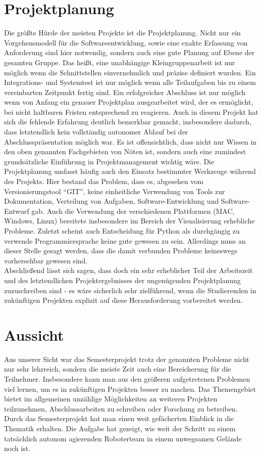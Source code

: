 \section{Projektplanung}
Die größte Hürde der meisten Projekte ist die Projektplanung. Nicht nur ein Vorgehensmodell für die Softwareentwicklung, sowie eine exakte Erfassung von Anforderung sind hier notwendig, sondern auch eine gute Planung auf Ebene der gesamten Gruppe. Das heißt, eine unabhängige Kleingruppenarbeit ist nur möglich wenn die Schnittstellen einvernehmlich und präzise definiert wurden. Ein Integrations- und Systemtest ist nur möglich wenn alle Teilaufgaben bis zu einem vereinbarten Zeitpunkt fertig sind. Ein erfolgreicher Abschluss ist nur möglich wenn von Anfang ein genauer Projektplan ausgearbeitet wird, der es ermöglicht, bei nicht haltbaren Fristen entsprechend zu reagieren.
Auch in diesem Projekt hat sich die fehlende Erfahrung deutlich bemerkbar gemacht, insbesondere dadurch, dass letztendlich kein vollständig autonomer Ablauf bei der Abschlusspräsentation möglich war. Es ist offensichtlich, dass nicht nur Wissen in den oben genannten Fachgebieten von Nöten ist, sondern auch eine zumindest grundsätzliche Einführung in Projektmanagement wichtig wäre.
Die Projektplanung umfasst häufig auch den Einsatz bestimmter Werkzeuge während des Projekts. Hier bestand das Problem, dass es, abgesehen vom Versionierungstool ``GIT'', keine einheitliche Verwendung von Tools zur Dokumentation, Verteilung von Aufgaben, Software-Entwicklung und Software-Entwurf gab. 
Auch die Verwendung der verschiedenen Plattformen (MAC, Windows, Linux) bereitete insbesondere im Bereich der Visualisierung erhebliche Probleme.
Zuletzt scheint auch Entscheidung für Python als durchgängig zu verwende Programmiersprache keine gute gewesen zu sein. Allerdings muss an dieser Stelle gesagt werden, dass die damit verbunden Probleme keineswegs vorhersehbar gewesen sind.
\\
Abschließend lässt sich sagen, dass doch ein sehr erheblicher Teil der Arbeitszeit und des letztendlichen Projektergebnisses der ungenügenden Projektplanung zuzuschreiben sind - es wäre sicherlich sehr zielführend, wenn die Studierenden in zukünftigen Projekten explizit auf diese Herausforderung vorbereitet werden.

\section{Aussicht}
Aus unserer Sicht war das Semesterprojekt trotz der genannten Probleme nicht nur sehr lehrreich, sondern die meiste Zeit auch eine Bereicherung für die Teilnehmer. Insbesondere kann man aus den größeren aufgetretenen Problemen viel lernen, um es in zukünftigen Projekten besser zu machen.
Das Themengebiet bietet im allgemeinen unzählige Möglichkeiten an weiteren Projekten teilzunehmen, Abschlussarbeiten zu schreiben oder Forschung zu betreiben. Durch das Semesterprojekt hat man einen weit gefächerten Einblick in die Thematik erhalten. Die Aufgabe hat gezeigt, wie weit der Schritt zu einem tatsächlich autonom agierenden Roboterteam in einem unwegsamen Gelände noch ist.